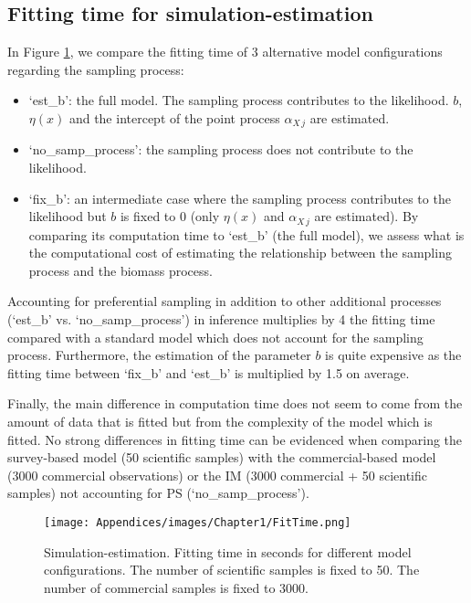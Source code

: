 \clearpage

\subsection{Fitting time for simulation-estimation}\label{appendix:FitTime}

In Figure \ref{fig:FitTime}, we compare the fitting time of 3 alternative model configurations regarding the sampling process:

\begin{itemize}
\item ‘est_b’: the full model. The sampling process contributes to the likelihood. \(b\), \(\eta(x)\) and the intercept of the point process \(\alpha_{X \, j}\) are estimated.
\item ‘no_samp_process’: the sampling process does not contribute to the likelihood.
\item ‘fix_b’: an intermediate case where the sampling process contributes to the likelihood but \(b\) is fixed to 0 (only \(\eta(x)\) and \(\alpha_{X \, j}\) are estimated). By comparing its computation time to ‘est_b’ (the full model), we assess what is the computational cost of estimating the relationship between the sampling process and the biomass process.
\end{itemize}

Accounting for preferential sampling in addition to other additional processes (‘est_b’ vs. ‘no_samp_process’) in inference multiplies by 4 the fitting time compared with a standard model which does not account for the sampling process. Furthermore, the estimation of the parameter $b$ is quite expensive as the fitting time between ‘fix_b’ and ‘est_b’ is multiplied by 1.5 on average.

Finally, the main difference in computation time does not seem to come from the amount of data that is fitted but from the complexity of the model which is fitted. No strong differences in fitting time can be evidenced when comparing the survey-based model (50 scientific samples) with the commercial-based model (3000 commercial observations) or the IM (3000 commercial + 50 scientific samples) not accounting for PS (‘no_samp_process’).

\newpage

\begin{figure}[H]
   \begin{center}
      \texttt{[image: Appendices/images/Chapter1/FitTime.png]}
   \end{center}
   \caption[Fitting time in seconds for different model configurations.]
   {Simulation-estimation. Fitting time in seconds for different model configurations. The number of scientific samples is fixed to 50. The number of commercial samples is fixed to 3000.}
   \label{fig:FitTime}
\end{figure}

